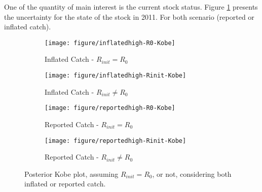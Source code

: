  One of the quantity of main interest is the current  stock status. 
 Figure \ref{fig:postKobe} presents the uncertainty for the state of the stock in 2011.
 For both scenario (reported or inflated catch).
\begin{figure}[htbp]
 \begin{subfigure}[b]{0.45\textwidth}
 \texttt{[image: figure/inflatedhigh-R0-Kobe]}
  \caption{Inflated Catch - $R_{init}=R_0$}
  \end{subfigure} \hfill
 \begin{subfigure}[b]{0.45\textwidth} 
 \texttt{[image: figure/inflatedhigh-Rinit-Kobe]}
  \caption{Inflated Catch - $R_{init}\ne R_0$}
  \end{subfigure}
 \begin{subfigure}[b]{0.45\textwidth}
 \texttt{[image: figure/reportedhigh-R0-Kobe]}
  \caption{Reported Catch - $R_{init}=R_0$}
  \end{subfigure} \hfill
 \begin{subfigure}[b]{0.45\textwidth} 
 \texttt{[image: figure/reportedhigh-Rinit-Kobe]}
  \caption{Reported Catch - $R_{init}\ne R_0$}
  \end{subfigure}
  \caption{Posterior Kobe plot, assuming $R_{init}=R_0$, or not, considering both inflated or reported catch.}
  \label{fig:postKobe}
 \end{figure}
 
 
